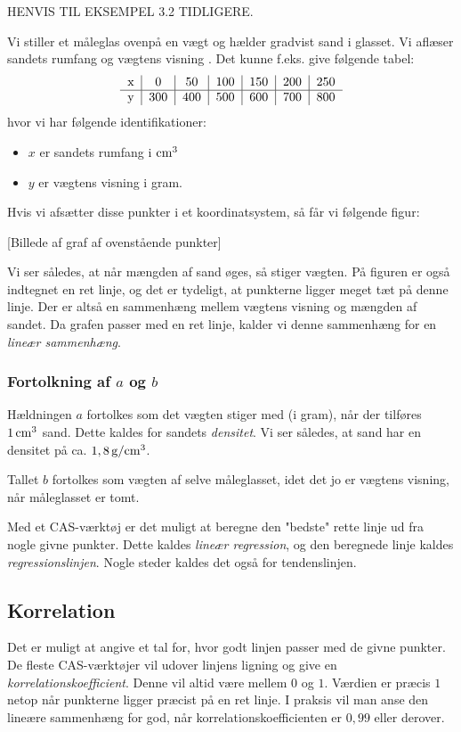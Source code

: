 \documentclass[12pt,oneside,a4paper]{article}
\begin{document}
HENVIS TIL EKSEMPEL 3.2 TIDLIGERE.

Vi stiller et måleglas ovenpå en vægt og hælder gradvist sand i glasset. Vi
aflæser sandets rumfang og vægtens visning . Det kunne f.eks. give følgende
tabel:
$$
\begin{tabular}{c|c|c|c|c|c|c}
    x &   0 &  50 & 100 & 150 & 200 & 250 \\
    \hline
    y & 300 & 400 & 500 & 600 & 700 & 800
\end{tabular}
$$
hvor vi har følgende identifikationer:
\begin{itemize}
    \item $x$ er sandets rumfang i ${\rm cm}^3$
    \item $y$ er vægtens visning i gram.
\end{itemize}

Hvis vi afsætter disse punkter i et koordinatsystem, så får vi følgende figur:

[Billede af graf af ovenstående punkter]

Vi ser således, at når mængden af sand øges, så stiger vægten. 
På figuren er også indtegnet en ret linje, og det er tydeligt, at punkterne
ligger meget tæt på denne linje.  Der er altså en sammenhæng mellem vægtens
visning og mængden af sandet. Da grafen passer med en ret linje, kalder vi
denne sammenhæng for en {\em lineær sammenhæng}.

\subsubsection{Fortolkning af $a$ og $b$}
Hældningen $a$ fortolkes som det vægten stiger med (i gram), når der tilføres 
$1\, {\rm cm}^3$ sand. Dette kaldes for sandets {\em densitet}. Vi ser således, 
at sand har en densitet på ca. $1,8\, {\rm g}/{\rm cm}^3$.

Tallet $b$ fortolkes som vægten af selve måleglasset, idet det jo er vægtens
visning, når måleglasset er tomt.

Med et CAS-værktøj er det muligt at beregne den "bedste" rette linje ud fra
nogle givne punkter. Dette kaldes {\em lineær regression}, og den beregnede
linje kaldes {\em regressionslinjen}. Nogle steder kaldes det også for
tendenslinjen.

\subsection{Korrelation}
Det er muligt at angive et tal for, hvor godt linjen passer med de givne
punkter.  De fleste CAS-værktøjer vil udover linjens ligning og give en {\em
korrelationskoefficient}.  Denne vil altid være mellem $0$ og $1$. Værdien er
præcis $1$ netop når punkterne ligger præcist på en ret linje.  I praksis vil
man anse den lineære sammenhæng for god, når korrelationskoefficienten er
$0,99$ eller derover.
\end{document}
